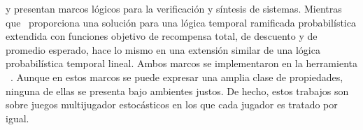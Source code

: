 \cite{DBLP:journals/fmsd/ChenFKPS13} y \cite{SvorenovaKwiatkowska16} presentan marcos lógicos para la verificación y síntesis de sistemas. Mientras que~\cite{DBLP:journals/fmsd/ChenFKPS13} proporciona una solución para una lógica temporal ramificada probabilística extendida con funciones objetivo de recompensa total, de descuento y de promedio esperado, \cite{SvorenovaKwiatkowska16} hace lo mismo en una extensión similar de una lógica probabilística temporal lineal. Ambos marcos se implementaron en la herramienta \Prism~\cite{DBLP:conf/cav/KwiatkowskaN0S20,DBLP:conf/cav/KwiatkowskaNP11}. Aunque en estos marcos se puede expresar una amplia clase de propiedades, ninguna de ellas se presenta bajo ambientes justos. De hecho, estos trabajos son sobre juegos multijugador estocásticos en los que cada jugador es tratado por igual.


